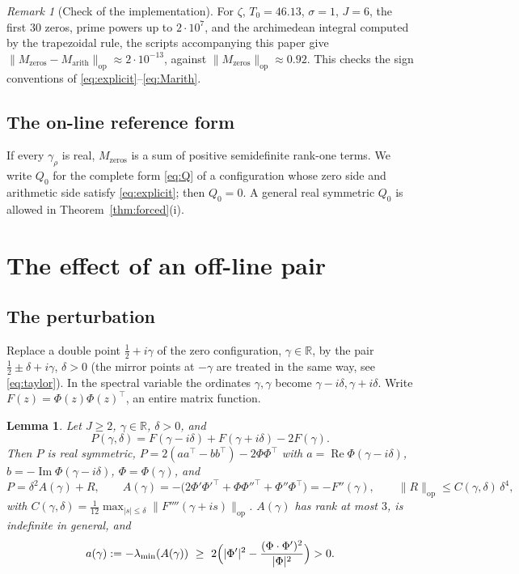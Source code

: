 \documentclass[11pt]{amsart}
\newtheorem{lemma}[theorem]{Lemma}
\theoremstyle{definition}
\theoremstyle{remark}
\newtheorem{remark}[theorem]{Remark}
\newcommand{\re}{\operatorname{Re}}
\newcommand{\im}{\operatorname{Im}}
\newcommand{\lmin}{\lambda_{\min}}
\newcommand{\Qzero}{Q_{0}}
\begin{document}
\begin{remark}[Check of the implementation]\label{rem:engine}
For $\zeta$, $T_0=46.13$, $\sigma=1$, $J=6$, the first $30$ zeros, prime
powers up to $2\cdot10^7$, and the archimedean integral computed by the
trapezoidal rule, the scripts accompanying this paper give
$\|M_{\mathrm{zeros}}-M_{\mathrm{arith}}\|_{\mathrm{op}}\approx2\cdot10^{-13}$,
against $\|M_{\mathrm{zeros}}\|_{\mathrm{op}}\approx0.92$. This checks the
sign conventions of \eqref{eq:explicit}--\eqref{eq:Marith}.
\end{remark}

\subsection{The on-line reference form}

If every $\gamma_\rho$ is real, $M_{\mathrm{zeros}}$ is a sum of positive
semidefinite rank-one terms. We write $\Qzero$ for the complete form
\eqref{eq:Q} of a configuration whose zero side and arithmetic side satisfy
\eqref{eq:explicit}; then $\Qzero=0$. A general real symmetric $\Qzero$ is
allowed in Theorem~\ref{thm:forced}(i).

\section{The effect of an off-line pair}\label{sec:forced}

\subsection{The perturbation}

Replace a double point $\tfrac12+i\gamma$ of the zero configuration, $\gamma\in\mathbb R$, by the
pair $\tfrac12\pm\delta+i\gamma$, $\delta>0$ (the mirror points at $-\gamma$
are treated in the same way, see \eqref{eq:taylor}). In the spectral
variable the ordinates $\gamma,\gamma$ become $\gamma-i\delta,\gamma+i\delta$.
Write $F(z)=\Phi(z)\Phi(z)^{\top}$, an entire matrix function.

\begin{lemma}\label{lem:rank2}
Let $J\ge2$, $\gamma\in\mathbb R$, $\delta>0$, and
\[
P(\gamma,\delta)=F(\gamma-i\delta)+F(\gamma+i\delta)-2F(\gamma).
\]
Then $P$ is real symmetric, $P=2(aa^{\top}-bb^{\top})-2\Phi\Phi^{\top}$ with
$a=\re\Phi(\gamma-i\delta)$, $b=-\im\Phi(\gamma-i\delta)$, $\Phi=\Phi(\gamma)$, and
\[
P=\delta^{2}A(\gamma)+R,\qquad
A(\gamma)=-\bigl(2\Phi'\Phi'^{\top}+\Phi\Phi''^{\top}+\Phi''\Phi^{\top}\bigr)=-F''(\gamma),
\qquad
\|R\|_{\mathrm{op}}\le C(\gamma,\delta)\,\delta^4,
\]
with $C(\gamma,\delta)=\frac1{12}\max_{|s|\le\delta}\|F''''(\gamma+is)\|_{\mathrm{op}}$.
$A(\gamma)$ has rank at most $3$, is indefinite in general, and
\[
a(\gamma):=-\lmin(A(\gamma))\ \ge\ 2\Bigl(|\Phi'|^{2}-\frac{(\Phi\cdot\Phi')^{2}}{|\Phi|^{2}}\Bigr)>0 .
\]
\end{lemma}
\end{document}
